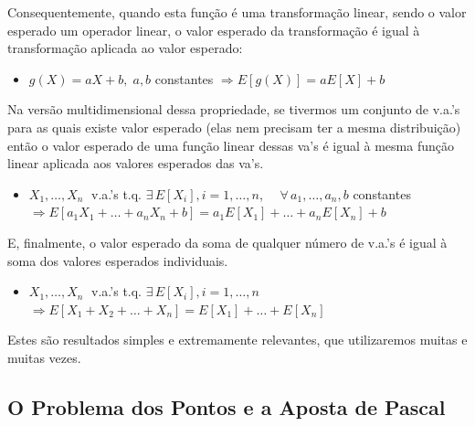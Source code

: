 \documentclass[
]{book}
\providecommand{\tightlist}{%
  \setlength{\itemsep}{0pt}\setlength{\parskip}{0pt}}
\theoremstyle{definition}
\theoremstyle{definition}
\theoremstyle{definition}
\theoremstyle{remark}
\begin{document}
Consequentemente, quando esta função é uma transformação linear, sendo o valor esperado um operador linear, o valor esperado da transformação é igual à transformação aplicada ao valor esperado:

\begin{itemize}
\tightlist
\item
  \({g(X) = a X + b, \; a,b}\) constantes \({\Longrightarrow E[g(X)] = aE[X]+b}\)
\end{itemize}

Na versão multidimensional dessa propriedade, se tivermos um conjunto de v.a.'s para as quais existe valor esperado (elas nem precisam ter a mesma distribuição) então o valor esperado de uma função linear dessas va's é igual à mesma função linear aplicada aos valores esperados das va's.

\begin{itemize}
\tightlist
\item
  \({X_1, \ldots, X_n}\;\) v.a.'s t.q. \({\exists \, E[X_i], i=1, \ldots, n}\), \(\quad{\forall \,a_1, \ldots, a_n, b}\) constantes\\
  \({\Longrightarrow E[a_1 X_1 + \ldots + a_n X_n + b] = a_1 E[X_1] + \ldots + a_n E[X_n] + b}\)
\end{itemize}

E, finalmente, o valor esperado da soma de qualquer número de v.a.'s é igual à soma dos valores esperados individuais.

\begin{itemize}
\tightlist
\item
  \({X_1, \ldots, X_n}\;\) v.a.'s t.q. \({\exists \, E[X_i], i=1, \ldots, n}\)\\
  \({\Longrightarrow E[X_1 + X_2 + \ldots + X_n] = E[X_1] + \ldots + E[X_n]}\)
\end{itemize}

Estes são resultados simples e extremamente relevantes, que utilizaremos muitas e muitas vezes.

\hypertarget{o-problema-dos-pontos-e-a-aposta-de-pascal}{%
\subsection*{O Problema dos Pontos e a Aposta de Pascal}\label{o-problema-dos-pontos-e-a-aposta-de-pascal}}
\end{document}
